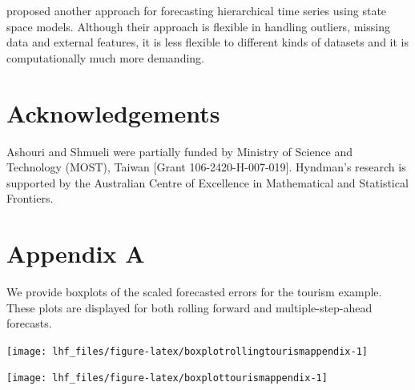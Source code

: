 \documentclass[11pt,a4paper,]{article}
\let\origfigure\figure
\let\endorigfigure\endfigure
\renewenvironment{figure}[1][2] {
    \expandafter\origfigure\expandafter[!htbp]
} {
    \endorigfigure
}
\begin{document}
\textcite{pennings2017} proposed another approach for forecasting hierarchical time series using state space models. Although their approach is flexible in handling outliers, missing data and external features, it is less flexible to different kinds of datasets and it is computationally much more demanding.

\hypertarget{acknowledgements}{%
\section*{Acknowledgements}\label{acknowledgements}}

Ashouri and Shmueli were partially funded by Ministry of Science and Technology (MOST), Taiwan {[}Grant 106-2420-H-007-019{]}. Hyndman's research is supported by the Australian Centre of Excellence in Mathematical and Statistical Frontiers.

\clearpage

\hypertarget{appendixA}{%
\section*{Appendix A}\label{appendixA}}

We provide boxplots of the scaled forecasted errors for the tourism example. These plots are displayed for both rolling forward and multiple-step-ahead forecasts.

\begin{figure}

{\centering \texttt{[image: lhf\_files/figure-latex/boxplotrollingtourismappendix-1]} 

}

\caption{Box plots of scaled forecast errors from reconciled and unreconciled ETS, ARIMA and OLS methods at each hierarchical level for rolling origin 1-step-ahead tourism demand.}\label{fig:boxplotrollingtourismappendix}
\end{figure}

\begin{figure}

{\centering \texttt{[image: lhf\_files/figure-latex/boxplottourismappendix-1]} 

}

\caption{Box plots of scaled forecast errors from reconciled and unreconciled ETS, ARIMA and OLS methods at each hierarchical level for fixed origin multi-step-ahead tourism demand.}\label{fig:boxplottourismappendix}
\end{figure}
\end{document}
